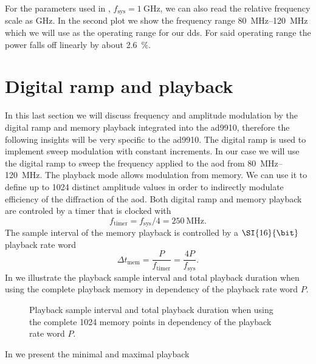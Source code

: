For the parameters used in ,
$f_\text{sys}=\SI{1}{\giga\hertz}$, we can also read the relative frequency
scale as \si{\giga\hertz}. In the second plot we show the frequency range
\SIrange{80}{120}{\mega\hertz} which we will use as the operating range
for our \gls{dds}. For said operating range the power falls off linearly by
about \SI{2.6}{\percent}.

\section{Digital ramp and playback}

In this last section we will discuss frequency and amplitude modulation by
the digital ramp and memory playback integrated into the \gls{ad9910},
therefore the following insights will be very specific to the \gls{ad9910}.
The digital ramp is used to implement sweep modulation with constant
increments. In our case we will use the digital ramp to sweep the frequency
applied to the \gls{aod} from \SIrange{80}{120}{\mega\hertz}. The playback
mode allows modulation from memory. We can use it to define up to \num{1024}
distinct amplitude values in order to indirectly modulate efficiency of the
diffraction of the \gls{aod}. Both digital ramp and memory playback are
controled by a timer that is clocked with
\begin{equation}
  f_{\text{timer}}
  =f_{\text{sys}}/4
  =\SI{250}{\mega\hertz}
  \label{eq:dds_timer}.
\end{equation}
The sample interval of the memory playback is controlled by a $\SI{16}{\bit}$
playback rate word
\begin{equation}
  \Delta t_\text{mem}
  =\frac{P}{f_\text{timer}}
  =\frac{4P}{f_\text{sys}}
  \label{eq:dds_playback_rate}.
\end{equation}
In  we illustrate the playback sample interval
and total playback duration when using the complete playback memory in
dependency of the playback rate word $P$.
\begin{figure}[htb]
  \centering
  \begin{adjustbox}{width=\textwidth}
    
  \end{adjustbox}
  \caption{Playback sample interval and total playback duration when using the
    complete \num{1024} memory points in dependency of the playback rate word
    $P$.
  }\label{fig:dds_playback_rate}
\end{figure}
In  we present the minimal and maximal playback
